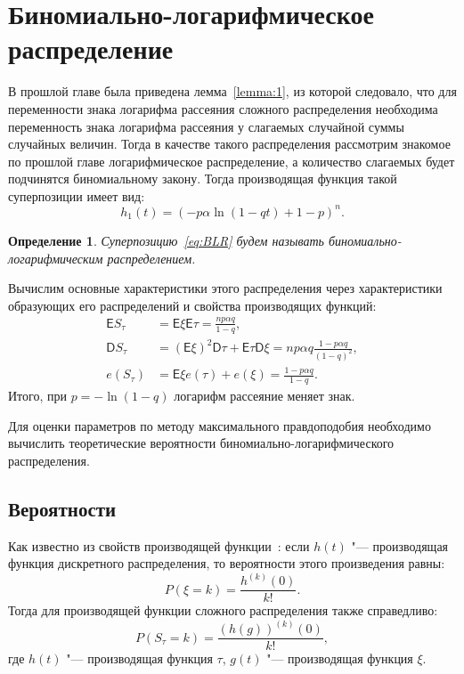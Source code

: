 \documentclass[12pt, specialist, subf, substylefile = spbu_report.rtx]{disser}
\newtheorem{define}{Определение}
\begin{document}
	\section{Биномиально-логарифмическое распределение}
	
	В прошлой главе была приведена лемма~\ref{lemma:1}, из которой следовало, что для переменности знака логарифма рассеяния сложного распределения необходима переменность знака логарифма рассеяния у слагаемых случайной суммы случайных величин. Тогда в качестве такого распределения рассмотрим знакомое по прошлой главе логарифмическое распределение, а количество слагаемых будет подчинятся биномиальному закону. Тогда производящая функция такой суперпозиции имеет вид:
	\begin{equation}\label{eq:BLR}
		h _1(t) = \left(-p \alpha \ln (1 - qt) + 1 - p\right) ^n.
	\end{equation}
	
	\begin{define}
		Суперпозицию~\ref{eq:BLR} будем называть биномиально-логарифмическим распределением.
		\label{def:1}
	\end{define}

	Вычислим основные характеристики этого распределения через характеристики образующих его распределений и свойства производящих функций:
	\[
	\begin{aligned}
		\mathsf{E} S _\tau &= \mathsf{E} \xi \mathsf{E} \tau = \frac {n p \alpha q} {1 - q},\\
		\mathsf{D} S _\tau &= \left( \mathsf{E} \xi \right) ^2 \mathsf{D} \tau + \mathsf{E} \tau \mathsf{D} \xi = n p \alpha q \frac {1 - p \alpha q} {(1 - q) ^2},\\
		e (S _\tau) &= \mathsf{E} \xi e (\tau) + e (\xi) = \frac {1 - p \alpha q} {1 - q}.
	\end{aligned}
	\]
	Итого, при $ p = - \ln (1 - q) $ логарифм рассеяние меняет знак.
	
	Для оценки параметров по методу максимального правдоподобия необходимо вычислить теоретические вероятности биномиально-логарифмического распределения.
	
	\subsection{Вероятности}
	
	\label{sec:probBLR}
	
	Как известно из свойств производящей функции~\cite{bib:feller1952}: если $ h(t) $ "--- производящая функция дискретного распределения, то вероятности этого произведения равны:
	\[ P(\xi = k) = \frac{h ^{(k)}(0)} {k!}. \]
	Тогда для производящей функции сложного распределения также справедливо:
	\[ P(S _\tau = k) = \frac{\left(h(g) \right) ^{(k)}(0)} {k!}, \]
	где $ h(t) $ "--- производящая функция $ \tau $, $ g(t) $ "--- производящая функция $ \xi $.
	
\end{document}
